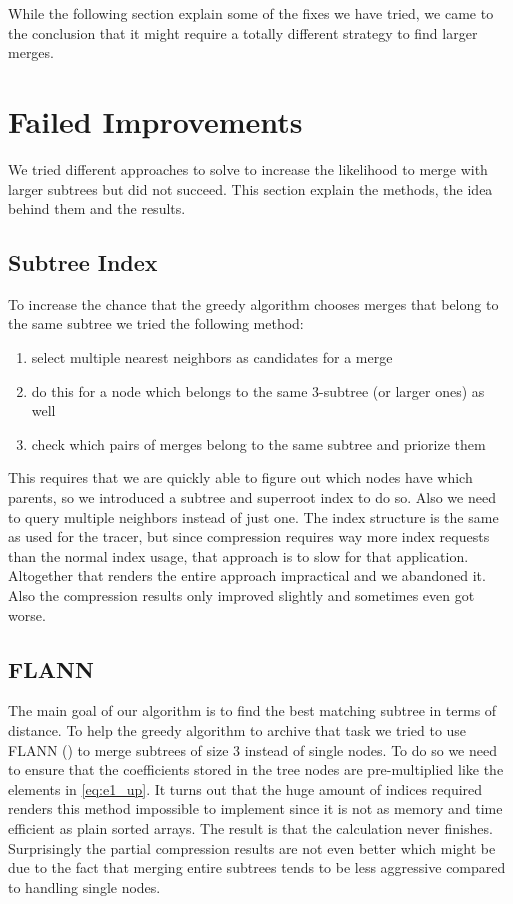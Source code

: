 While the following section explain some of the fixes we have tried, we came to the conclusion that it might require a totally different strategy to find larger merges.



\section{Failed Improvements}
\label{sec:algorithm:fail}

We tried different approaches to solve to increase the likelihood to merge with larger subtrees but did not succeed. This section explain the methods, the idea behind them and the results.


\subsection{Subtree Index}
\label{ssec:algorithm:fail:stindex}

To increase the chance that the greedy algorithm chooses merges that belong to the same subtree we tried the following method:

\begin{enumerate}
    \item select multiple nearest neighbors as candidates for a merge
    \item do this for a node which belongs to the same \num{3}-subtree (or larger ones) as well
    \item check which pairs of merges belong to the same subtree and priorize them
\end{enumerate}

This requires that we are quickly able to figure out which nodes have which parents, so we introduced a subtree and superroot index to do so. Also we need to query multiple neighbors instead of just one. The index structure is the same as used for the tracer, but since compression requires way more index requests than the normal index usage, that approach is to slow for that application. Altogether that renders the entire approach impractical and we abandoned it. Also the compression results only improved slightly and sometimes even got worse.


\subsection{FLANN}
\label{ssec:algorithm:fail:flann}

The main goal of our algorithm is to find the best matching subtree in terms of distance. To help the greedy algorithm to archive that task we tried to use FLANN (\cite{FLANN}) to merge subtrees of size \num{3} instead of single nodes. To do so we need to ensure that the coefficients stored in the tree nodes are pre-multiplied like the elements in \autoref{eq:e1_up}. It turns out that the huge amount of indices required renders this method impossible to implement since it is not as memory and time efficient as plain sorted arrays. The result is that the calculation never finishes. Surprisingly the partial compression results are not even better which might be due to the fact that merging entire subtrees tends to be less aggressive compared to handling single nodes.


